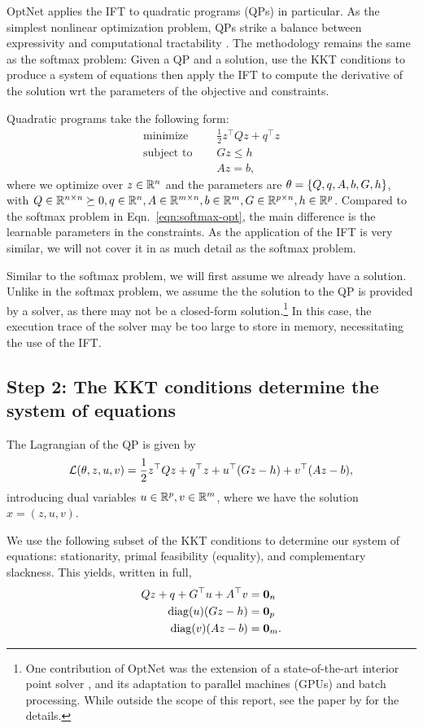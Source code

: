 \documentclass[11pt]{article}
\begin{document}
OptNet applies the IFT to quadratic programs (QPs) in particular.
As the simplest nonlinear optimization problem,
QPs strike a balance between expressivity and computational tractability \citep{simplex}.
The methodology remains the same as the softmax problem:
Given a QP and a solution,
use the KKT conditions to produce a system of equations then apply the IFT
to compute the derivative of the solution wrt the
parameters of the objective and constraints.

Quadratic programs take the following form:
\begin{equation}
\label{eqn:qp}
\begin{aligned}
\textrm{minimize } \quad & \frac12 z^\top Q z + q^\top z\\
\textrm{subject to } \quad
& Gz \leq h\\
& Az = b,
\end{aligned}
\end{equation}
where we optimize over $z\in\mathbb{R}^n$ and the parameters are $\theta = \left\{Q, q, A, b, G, h\right\}$,
with $Q\in\mathbb{R}^{n\times n}\succeq0, q\in\mathbb{R}^n, A\in\mathbb{R}^{m\times n},b\in\mathbb{R}^{m},G\in\mathbb{R}^{p\times n},
h\in\mathbb{R}^p$.
Compared to the softmax problem in Eqn.~\ref{eqn:softmax-opt},
the main difference is the learnable parameters in the constraints.
As the application of the IFT is very similar, we will not cover it in as much
detail as the softmax problem.

Similar to the softmax problem, we will first assume we already have a solution.
Unlike in the softmax problem, we assume the the solution to the QP is provided by a solver,
as there may not be a closed-form solution.\footnote{
One contribution of OptNet was the extension of a state-of-the-art interior point
solver \citep{optnet}, and its adaptation to parallel machines (GPUs) and batch processing.
While outside the scope of this report, see the paper by \citet{optnet} for the details.
}
In this case, the execution trace of the solver may be too large to store in memory,
necessitating the use of the IFT.

\subsection*{Step 2: The KKT conditions determine the system of equations}
The Lagrangian of the QP is given by
$$
\mathcal{L}(\theta,z,u,v) = \frac12 z^\top Qz + q^\top z + u^\top(Gz-h) + v^\top(Az-b),
$$
introducing dual variables $u\in\mathbb{R}^p,v\in\mathbb{R}^m$,
where we have the solution $x = (z,u,v)$.

We use the following subset of the KKT conditions to determine our system of equations:
stationarity, primal feasibility (equality), and complementary slackness.
This yields, written in full,
\begin{equation}
\begin{aligned}
Qz + q + G^\top u + A^\top v  &= \mathbf{0}_n\\
\mathrm{diag}(u)(Gz-h) &= \mathbf{0}_p\\
\mathrm{diag}(v)(Az-b) &= \mathbf{0}_m.
\end{aligned}
\end{equation}
\end{document}
